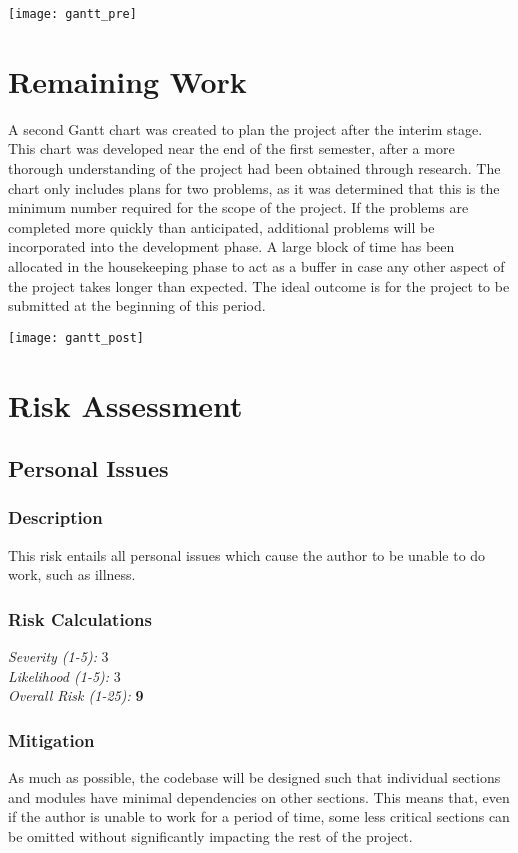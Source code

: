 \texttt{[image: gantt\_pre]}


\section{Remaining Work}
A second Gantt chart was created to plan the project after the interim stage. This chart was developed near the end of the first semester, after a more thorough understanding of the project had been obtained through research. The chart only includes plans for two problems, as it was determined that this is the minimum number required for the scope of the project. If the problems are completed more quickly than anticipated, additional problems will be incorporated into the development phase. A large block of time has been allocated in the housekeeping phase to act as a buffer in case any other aspect of the project takes longer than expected. The ideal outcome is for the project to be submitted at the beginning of this period.

\texttt{[image: gantt\_post]}



\section{Risk Assessment}
\subsection{Personal Issues}

\subsubsection{Description}
This risk entails all personal issues which cause the author to be unable to do work, such as illness.

\subsubsection{Risk Calculations}
\emph{Severity (1-5):} 3 \\
\emph{Likelihood (1-5):} 3 \\
\emph{Overall Risk (1-25):} \textbf{9}

\subsubsection{Mitigation}
As much as possible, the codebase will be designed such that individual sections and modules have minimal dependencies on other sections. This means that, even if the author is unable to work for a period of time, some less critical sections can be omitted without significantly impacting the rest of the project.

